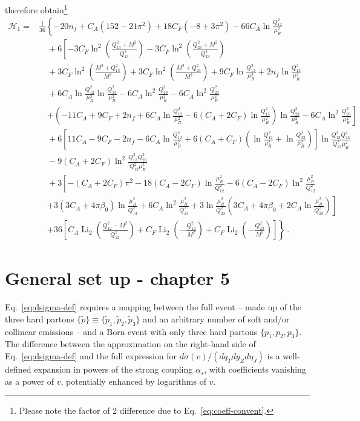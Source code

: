 therefore obtain\footnote{Please note the factor of 2 difference due to
Eq.~\eqref{eq:coeff-convent}.}
\begin{equation}
\begin{aligned}
\mathcal{H}_1=&\frac{1}{36}\left\{-20n_f+C_A(152-21\pi^2)+18C_F(-8+3\pi^2)
-66C_A\ln\frac{Q_{12}^2}{\mu_R^2}\right.\\[1ex]
&\quad+6\left[-3C_F\ln^2\left(\frac{Q_{13}^2+M^2}{Q_{13}^2}\right)-3C_F\ln^2\left(\frac{Q_{23}^2+M^2}{Q_{23}^2}\right)\right.\\
&\quad+3C_F\ln^2\left(\frac{M^2+Q_{13}^2}{M^2}\right)+3C_F\ln^2\left(\frac{M^2+Q_{23}^2}{M^2}\right)
+9C_F\ln\frac{Q_{13}^2}{\mu_R^2}+2n_f\ln\frac{Q_{13}^2}{\mu_R^2}\\
&\quad+6C_A\ln\frac{Q_{12}^2}{\mu_R^2}\ln\frac{Q_{13}^2}{\mu_R^2}
-6C_A\ln^2\frac{Q_{13}^2}{\mu_R^2}-6C_A\ln^2\frac{Q_{23}^2}{\mu_R^2}\\
&\quad\left.+\left(-11C_A+9C_F+2n_f+6C_A\ln\frac{Q_{12}^2}{\mu_R^2}
-6(C_A+2C_F)\ln\frac{Q_{13}^2}{\mu_R^2}\right)\ln\frac{Q_{23}^2}{\mu_R^2}-6C_A\ln^2\frac{Q_{23}^2}{\mu_R^2}\right]\\[1ex]
&\quad+6\left[11C_A-9C_F-2n_f-6C_A\ln\frac{Q_{12}^2}{\mu_R^2}
+6(C_A+C_F)\left(\ln\frac{Q_{12}^2}{\mu_R^2}+\ln\frac{Q_{23}^2}{\mu_R^2}\right)\right]
\ln\frac{Q_{13}^2Q_{23}^2}{Q_{12}^2\mu_R^2}\\[1ex]
&\quad-9(C_A+2C_F)\ln^2\frac{Q_{13}^2Q_{23}^2}{Q_{12}^2\mu_R^2}\\[1ex]
&\quad+3\left[-(C_A+2C_F)\pi^2-18(C_A-2C_F)\ln\frac{\mu_R^2}{Q_{12}^2}
-6(C_A-2C_F)\ln^2\frac{\mu_R^2}{Q_{12}^2}\right.\\
&\quad\left.+3(3C_A+4\pi\beta_0)\ln\frac{\mu_R^2}{Q_{13}^2}
+6C_A\ln^2\frac{\mu_R^2}{Q_{13}^2}+3\ln\frac{\mu_R^2}{Q_{23}^2}\left(3C_A+4\pi\beta_0
+2C_A\ln\frac{\mu_R^2}{Q_{23}^2}\right)\right]\\[1ex]
&\quad\left.+36\left[C_A\operatorname{Li}_2\left(\frac{Q_{12}^2-M^2}{Q_{12}^2}\right)
+C_F\operatorname{Li}_2\left(-\frac{Q_{13}^2}{M^2}\right)
+C_F\operatorname{Li}_2\left(-\frac{Q_{23}^2}{M^2}\right)\right]\right\}\,.
\end{aligned}
\end{equation}

\section{General set up - chapter 5}

Eq.~\eqref{eq:dsigma-def}
requires a mapping between the full event -- made up
of the three hard partons $\{\tilde p\}\equiv\{\tilde p_1,\tilde p_2,\tilde p_3\}$ and an arbitrary number of soft and/or collinear emissions -- and
a Born event with only three hard partons $\{p_1,p_2,p_3\}$.
The difference between the approximation on the right-hand side of
Eq.~\eqref{eq:dsigma-def} and the full expression for
$ d\sigma(v)/(dq_T dy_Z d\eta_J)$ is a well-defined expansion in powers of the
strong coupling $\alpha_s$, with coefficients vanishing as a power of
$v$, potentially enhanced by logarithms of $v$. 

